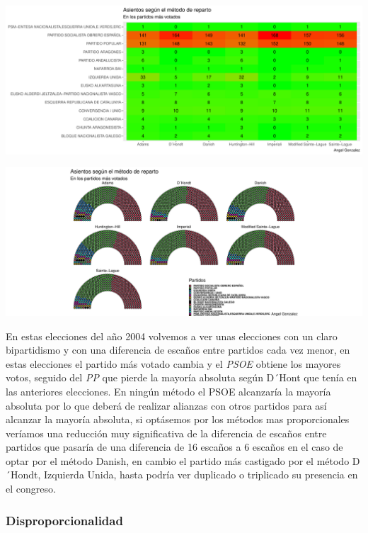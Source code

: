 \documentclass[12pt,a4paper,]{book}
\numberwithin{dummy}{section}
\theoremstyle{ocrenumbox}
\theoremstyle{blacknumex}
\theoremstyle{blacknumbox}
\theoremstyle{ocrenum}
\theoremstyle{ocrenum}
\begin{document}
\begin{center}\includegraphics[width=0.95\linewidth]{figurasR/unnamed-chunk-131-2} \end{center}

\begin{center}\includegraphics[width=0.95\linewidth]{figurasR/unnamed-chunk-131-3} \end{center}

En estas elecciones del año 2004 volvemos a ver unas elecciones con un
claro bipartidismo y con una diferencia de escaños entre partidos cada
vez menor, en estas elecciones el partido más votado cambia y el
\emph{PSOE} obtiene los mayores votos, seguido del \emph{PP} que pierde
la mayoría absoluta según D´Hont que tenía en las anteriores elecciones.
En ningún método el PSOE alcanzaría la mayoría absoluta por lo que
deberá de realizar alianzas con otros partidos para así alcanzar la
mayoría absoluta, si optásemos por los métodos mas proporcionales
veríamos una reducción muy significativa de la diferencia de escaños
entre partidos que pasaría de una diferencia de 16 escaños a 6 escaños
en el caso de optar por el método Danish, en cambio el partido más
castigado por el método D´Hondt, Izquierda Unida, hasta podría ver
duplicado o triplicado su presencia en el congreso.

\hypertarget{disproporcionalidad-8}{%
\subsubsection{Disproporcionalidad}\label{disproporcionalidad-8}}
\end{document}
